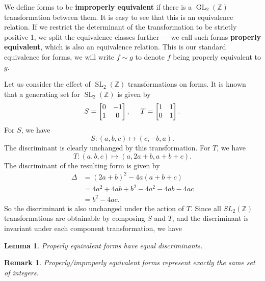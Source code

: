 \documentclass[honours,12pt]{unswthesis}
\newcommand{\Z}{\mathbb{Z}} %
\DeclareMathOperator{\GL}{GL}
\DeclareMathOperator{\SL}{SL}
\newcommand{\bmat}[1]{\begin{bmatrix}#1\end{bmatrix}}
\newtheorem{lemma}[theorem]{Lemma}
\newtheorem{remark}[theorem]{Remark}
\numberwithin{equation}{section}
\begin{document}
We define forms to be \textbf{improperly equivalent} if there is a $\GL_2(\Z)$ transformation between them.
It is easy to see that this is an equivalence relation.
If we restrict the determinant of the transformation to be strictly positive 1, we split the equivalence classes further ---
we call such forms \textbf{properly equivalent}, which is also an equivalence relation.
This is our standard equivalence for forms, we will write $f \sim g$ to denote $f$ being properly equivalent to $g$.

Let us consider the effect of $\SL_2(\Z)$ transformations on forms.
It is known \cite[\S\,2.4]{buchmann} that a generating set for $\SL_2(\Z)$ is given by
$$S = \bmat{ 0 & -1 \\ 1 & 0 }, \hspace{5mm} T = \bmat{ 1 & 1 \\ 0 & 1}.$$
For $S$, we have
$$S : (a, b, c) \longmapsto (c, -b, a).$$
The discriminant is clearly unchanged by this transformation.
For $T$, we have
$$T : (a, b, c) \longmapsto (a, 2a + b, a + b + c).$$
The discriminant of the resulting form is given by
\begin{align*}
    \Delta &= (2a + b)^2 - 4a(a + b + c) \\
    &= 4a^2 + 4ab + b^2 - 4a^2 - 4ab - 4ac \\
    &= b^2 - 4ac.
\end{align*}
So the discriminant is also unchanged under the action of $T$.
Since all $SL_2(\Z)$ transformations are obtainable by composing $S$ and $T$, and the discriminant is invariant under each component transformation, we have

\vspace{2mm}
\begin{lemma}
    Properly equivalent forms have equal discriminants.
\end{lemma}

\vspace{2mm}
\begin{remark}
    Properly/improperly equivalent forms represent exactly the same set of integers.
\end{remark}
\end{document}
